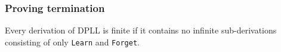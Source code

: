 \documentclass[smaller]{beamer}
\newcommand{\state}[2]{{#1\parallel #2}}
\newcommand{\red}[1]{\textcolor{red}{#1}}
\begin{document}
\begin{frame}
\frametitle{Proving termination}
\begin{theorem}
Every derivation of DPLL is finite if it contains no infinite sub-derivations consisting of only {\tt Learn} and {\tt Forget}.
\end{theorem}
\end{frame}
\end{document}
